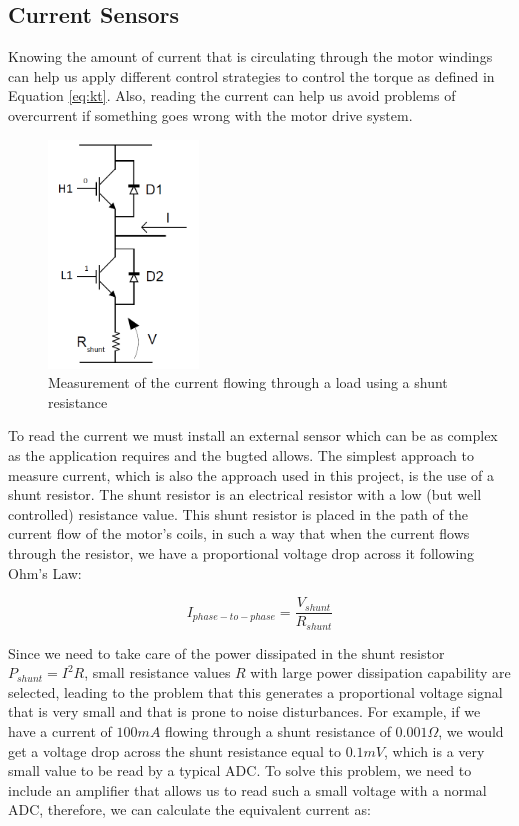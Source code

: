 \subsection{Current Sensors}\label{subsection:current_sensors}

Knowing the amount of current that is circulating through the motor windings can help us apply different control strategies to control the torque as defined in Equation \ref{eq:kt}. Also, reading the current can help us avoid problems of overcurrent if something goes wrong with the motor drive system.

\begin{figure}[htbp]
\centering
\includegraphics[width=4cm]{Images/shunt_amp.png} 
\caption[Shunt Resistance Current Detection]{Measurement of the current flowing through a load using a shunt resistance}
\label{fig:shunt_amp}
\end{figure}

To read the current we must install an external sensor which can be as complex as the application requires and the bugted allows. The simplest approach to measure current, which is also the approach used in this project, is the use of a shunt resistor. The shunt resistor is an electrical resistor with a low (but well controlled) resistance value. This shunt resistor is placed in the path of the current flow of the motor's coils, in such a way that when the current flows through the resistor, we have a proportional voltage drop across it following Ohm's Law:

\begin{equation}\label{ohm_shunt}
	I_{phase-to-phase} = \frac{V_{shunt}}{R_{shunt}}
\end{equation}

Since we need to take care of the power dissipated in the shunt resistor $P_{shunt} = I^{2}R$, small resistance values $R$ with large power dissipation capability are selected, leading to the problem that this generates a proportional voltage signal that is very small and that is prone to noise disturbances. For example, if we have a current of $100 mA$ flowing through a shunt resistance of $0.001 \Omega$, we would get a voltage drop across the shunt resistance equal to $0.1 mV$, which is a very small value to be read by a typical \acf{ADC}. To solve this problem, we need to include an amplifier that allows us to read such a small voltage with a normal \ac{ADC}, therefore, we can calculate the equivalent current as:

